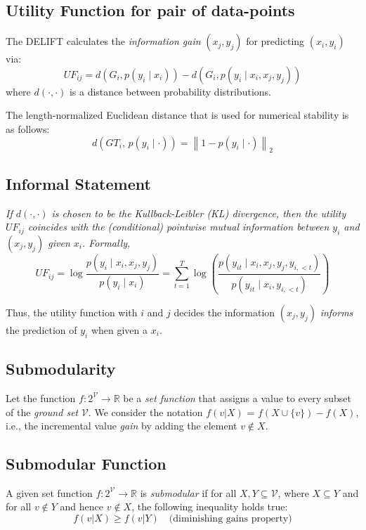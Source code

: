 \documentclass{article}
\begin{document}
\subsection*{Utility Function for pair of data-points}
The DELIFT \cite{agarwal2024delift} calculates the \textit{information gain} $(x_j, y_j)$ for predicting $(x_i, y_i)$ via:
\begin{equation}\label{eq:4.1}
UF_{ij} = d(G_i, p(y_i \mid x_i)) - d(G_i, p(y_i \mid x_i, x_j, y_j))
\end{equation}
where $d(\cdot, \cdot)$ is a distance between probability distributions.

The length-normalized Euclidean distance that is used for numerical stability is as follows:
\begin{equation}\label{eq:4.2}
    d(GT_i,\, p(y_i \mid \cdot)) = \left\| 1 - p(y_i \mid \cdot) \right\|_2
\end{equation}


\subsection*{Informal Statement} \textit{If $d(\cdot, \cdot)$ is chosen to be the Kullback-Leibler (KL) divergence, then the utility $UF_{ij}$ coincides with the (conditional) pointwise mutual information between $y_i$ and $(x_j, y_j)$ given $x_i$. Formally,}
\begin{equation}\label{eq:4.3}
UF_{ij} = \log \frac{p(y_i \mid x_i, x_j, y_j)}{p(y_i \mid x_i)} = \sum_{t=1}^T \log \left( \frac{p(y_{it} \mid x_i, x_j, y_j, y_{i,<t})}{p(y_{it} \mid x_i, y_{i,<t})} \right)
\end{equation}

Thus, the utility function with $i$ and $j$ decides the information $(x_j, y_j)$ \textit{informs} the prediction of $y_i$ when given a $x_i$.




\subsection{Submodularity}
Let the function $f : 2^{\mathcal{V}} \rightarrow \mathbb{R}$ be a \textit{set function} that assigns a value to every subset of the \textit{ground set} $\mathcal{V}$. We consider the notation $f(v|X)$ = $f(X \cup \{v\}) - f(X)$, i.e., the incremental value \textit{gain} by adding the element $v \notin X$.

\subsection*{Submodular Function} A given set function $f : 2^{\mathcal{V}} \rightarrow \mathbb{R}$ is \textit{submodular} if for all $X, Y \subseteq \mathcal{V}$, where $X \subseteq Y$ and for all $v \notin Y$ and hence $v \notin X$, the following inequality holds true:
\begin{equation}\label{eq:4.4}
f(v|X) \geq f(v|Y) \quad \text{(diminishing gains property)}
\end{equation}
\end{document}
